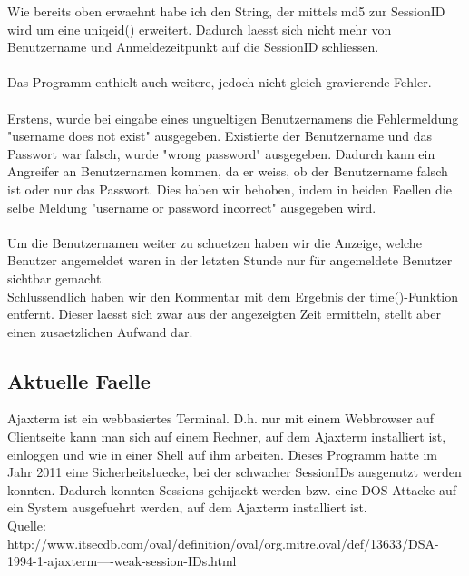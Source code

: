 Wie bereits oben erwaehnt habe ich den String, der mittels md5 zur SessionID wird um eine uniqeid() erweitert. Dadurch laesst sich nicht mehr von Benutzername und Anmeldezeitpunkt auf die SessionID schliessen.\\\\
Das Programm enthielt auch weitere, jedoch nicht gleich gravierende Fehler.\\\\
Erstens, wurde bei eingabe eines ungueltigen Benutzernamens die Fehlermeldung "username does not exist" ausgegeben. Existierte der Benutzername und das Passwort war falsch, wurde "wrong password" ausgegeben. Dadurch kann ein Angreifer an Benutzernamen kommen, da er weiss, ob der Benutzername falsch ist oder nur das Passwort. Dies haben wir behoben, indem in beiden Faellen die selbe Meldung "username or password incorrect" ausgegeben wird.\\\\
Um die Benutzernamen weiter zu schuetzen haben wir die Anzeige, welche Benutzer angemeldet waren in der letzten Stunde nur für angemeldete Benutzer sichtbar gemacht.\\
Schlussendlich haben wir den Kommentar mit dem Ergebnis der time()-Funktion entfernt. Dieser laesst sich zwar aus der angezeigten Zeit ermitteln, stellt aber einen zusaetzlichen Aufwand dar.

\subsection{Aktuelle Faelle}

Ajaxterm ist ein webbasiertes Terminal. D.h. nur mit einem Webbrowser auf Clientseite kann man sich auf einem Rechner, auf dem Ajaxterm installiert ist, einloggen und wie in einer Shell auf ihm arbeiten. Dieses Programm hatte im Jahr 2011 eine Sicherheitsluecke, bei der schwacher SessionIDs ausgenutzt werden konnten. Dadurch konnten Sessions gehijackt werden bzw. eine DOS Attacke auf ein System ausgefuehrt werden, auf dem Ajaxterm installiert ist.\\
Quelle: http://www.itsecdb.com/oval/definition/oval/org.mitre.oval/def/13633/DSA-1994-1-ajaxterm----weak-session-IDs.html

